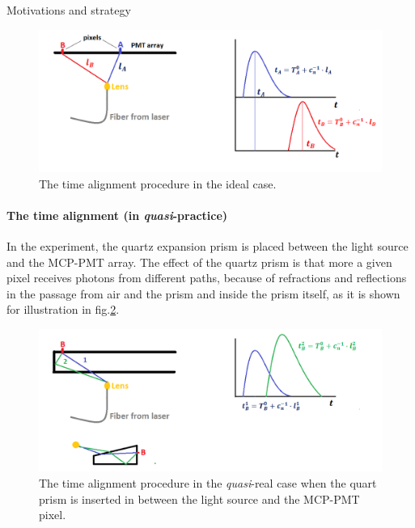 \documentclass[a4paper,11pt]{article}
\begin{document}
\begin{subsection}{Motivations and strategy}
 
\begin{figure}
\centering
\begin{minipage}{1\textwidth}
\includegraphics[width=\textwidth]{pictures/calibration_i}
\caption{The time alignment procedure in the ideal case.}
\label{fig:cal1}
\end{minipage}
\end{figure}


\paragraph{The time alignment (in {\itshape quasi}-practice)} In the experiment, the quartz expansion prism is placed between the light source and the MCP-PMT array. The effect of the quartz prism is that more a given pixel receives photons from different paths, because of refractions and reflections in the passage from air and the prism and inside the prism itself, as it is shown for illustration in fig.\ref{fig:cal2}.

\begin{figure}
\centering
\begin{minipage}{1\textwidth}
\includegraphics[width=\textwidth]{pictures/calibration_ii_0}
\caption{The time alignment procedure in the {\itshape quasi}-real case when the quart prism is inserted in between the light source and the MCP-PMT pixel.}
\label{fig:cal2}
\end{minipage}
\end{figure}



\end{subsection}
\end{document}
